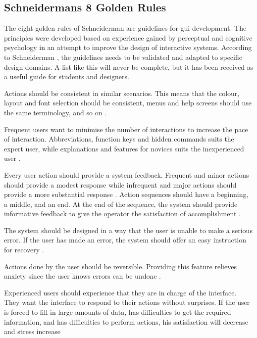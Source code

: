 \subsection{Schneidermans 8 Golden Rules}
\label{sec:schneiderman}
The eight golden rules of Schneiderman are guidelines for \acrshort{gui} development. The principles were developed based on experience gained by perceptual and cognitive psychology in an attempt to improve the design of interactive systems. According to Schneiderman \cite{schneiderman}, the guidelines needs to be validated and adapted to specific design domains. A list like this will never be complete, but it has been received as a useful guide for students and designers.

Actions should be consistent in similar scenarios. This means that the colour, layout and font selection should be consistent, menus and help screens should use the same terminology, and so on \cite{schneiderman}.

Frequent users want to minimise the number of interactions to increase the pace of interaction. Abbreviations, function keys and hidden commands suits the expert user, while explanations and features for novices suits the inexperienced user \cite{schneiderman}.

Every user action should provide a system feedback. Frequent and minor actions should provide a modest response while infrequent and major actions should provide a more substantial response \cite{schneiderman}.
\newpage
{}
Action sequences should have a beginning, a middle, and an end. At the end of the sequence, the system should provide informative feedback to give the operator the satisfaction of accomplishment \cite{schneiderman}.

The system should be designed in a way that the user is unable to make a serious error. If the user has made an error, the system should offer an easy instruction for recovery \cite{schneiderman}.

Actions done by the user should be reversible. Providing this feature relieves anxiety since the user knows errors can be undone \cite{schneiderman}.

Experienced users should experience that they are in charge of the interface. They want the interface to respond to their actions without surprises. If the user is forced to fill in large amounts of data, has difficulties to get the required information, and has difficulties to perform actions, his satisfaction will decrease and stress increase \cite{schneiderman}
\newpage